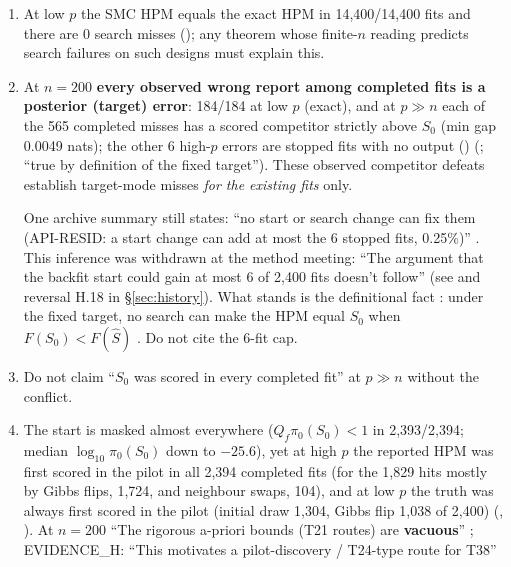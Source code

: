 \begin{agentnote}
\begin{enumerate}
\item At low $p$ the SMC HPM equals the exact HPM in 14,400/14,400 fits and there are 0 search misses (); any theorem whose
finite-$n$ reading predicts search failures on such designs must explain this.
\item At $n=200$ \textbf{every observed wrong report among completed fits is a posterior (target) error}: 184/184 at low $p$ (exact), and at $p\gg n$ each of the 565
completed misses has a scored competitor strictly above $S_0$ (min gap 0.0049 nats); the other 6 high-$p$ errors are stopped fits with no output () (; ``true by definition of the
fixed target''). These observed competitor defeats establish target-mode misses \emph{for the existing fits} only.
\begin{uncertain}
One archive summary still states: ``no start or search change can fix them (API-RESID: a start change can add at most the 6 stopped
fits, 0.25\%)'' . This inference was withdrawn at the method meeting: ``The argument that the
backfit start could gain at most 6 of 2,400 fits doesn't follow''   (see  and
reversal H.18 in \S\ref{sec:history}). What stands is the definitional fact : under the fixed target, no search can make the
HPM equal $S_0$ when $F(S_0)<F(\hat S)$ . Do not cite the 6-fit cap.
\end{uncertain}
\item Do not claim ``$S_0$ was scored in every completed fit'' at $p\gg n$ without the  conflict.
\item The start is masked almost everywhere ($Q_f\pi_0(S_0)<1$ in 2,393/2,394; median $\log_{10}\pi_0(S_0)$ down to $-25.6$), yet at high $p$ the reported HPM was
first scored in the pilot in all 2,394 completed fits (for the 1,829 hits mostly by Gibbs flips, 1,724, and neighbour swaps, 104), and at low $p$ the truth was always first scored in the pilot (initial draw 1,304, Gibbs flip 1,038 of 2,400) (, ). At $n=200$ ``The rigorous a-priori bounds (T21 routes) are \textbf{vacuous}''
; EVIDENCE\_H: ``This motivates a pilot-discovery / T24-type route for T38''

\end{enumerate}
\end{agentnote}
